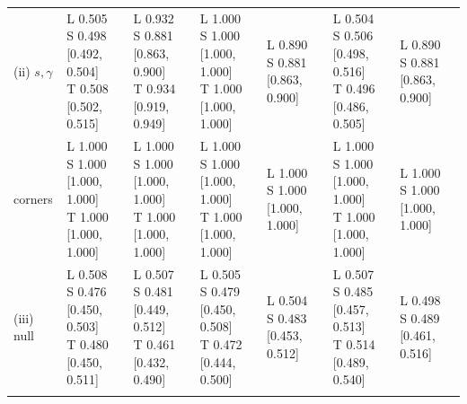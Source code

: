 \begin{tabular}{lllllll}
\addlinespace
(ii) $s,\gamma$ & \makecell[l]{L 0.505\\ S 0.498 [0.492, 0.504]\\ T 0.508 [0.502, 0.515]} & \makecell[l]{L 0.932\\ S 0.881 [0.863, 0.900]\\ T 0.934 [0.919, 0.949]} & \makecell[l]{L 1.000\\ S 1.000 [1.000, 1.000]\\ T 1.000 [1.000, 1.000]} & \makecell[l]{L 0.890\\ S 0.881 [0.863, 0.900]} & \makecell[l]{L 0.504\\ S 0.506 [0.498, 0.516]\\ T 0.496 [0.486, 0.505]} & \makecell[l]{L 0.890\\ S 0.881 [0.863, 0.900]} \\
\addlinespace
corners & \makecell[l]{L 1.000\\ S 1.000 [1.000, 1.000]\\ T 1.000 [1.000, 1.000]} & \makecell[l]{L 1.000\\ S 1.000 [1.000, 1.000]\\ T 1.000 [1.000, 1.000]} & \makecell[l]{L 1.000\\ S 1.000 [1.000, 1.000]\\ T 1.000 [1.000, 1.000]} & \makecell[l]{L 1.000\\ S 1.000 [1.000, 1.000]} & \makecell[l]{L 1.000\\ S 1.000 [1.000, 1.000]\\ T 1.000 [1.000, 1.000]} & \makecell[l]{L 1.000\\ S 1.000 [1.000, 1.000]} \\
\addlinespace
(iii) null & \makecell[l]{L 0.508\\ S 0.476 [0.450, 0.503]\\ T 0.480 [0.450, 0.511]} & \makecell[l]{L 0.507\\ S 0.481 [0.449, 0.512]\\ T 0.461 [0.432, 0.490]} & \makecell[l]{L 0.505\\ S 0.479 [0.450, 0.508]\\ T 0.472 [0.444, 0.500]} & \makecell[l]{L 0.504\\ S 0.483 [0.453, 0.512]} & \makecell[l]{L 0.507\\ S 0.485 [0.457, 0.513]\\ T 0.514 [0.489, 0.540]} & \makecell[l]{L 0.498\\ S 0.489 [0.461, 0.516]} \\
\addlinespace

\end{tabular}
